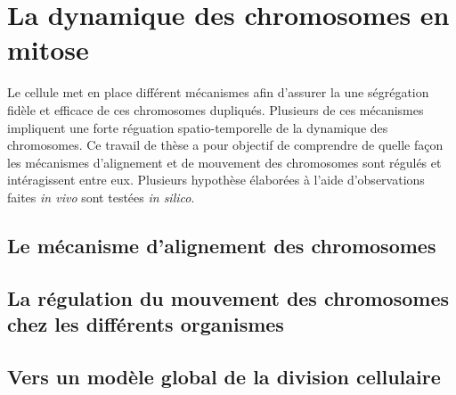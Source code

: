 \documentclass[12pt,a4paper,twoside,openright]{book}
\begin{document}
\section{La dynamique des chromosomes en
mitose}\label{la-dynamique-des-chromosomes-en-mitose}

Le cellule met en place différent mécanismes afin d'assurer la une
ségrégation fidèle et efficace de ces chromosomes dupliqués. Plusieurs
de ces mécanismes impliquent une forte réguation spatio-temporelle de la
dynamique des chromosomes. Ce travail de thèse a pour objectif de
comprendre de quelle façon les mécanismes d'alignement et de mouvement
des chromosomes sont régulés et intéragissent entre eux. Plusieurs
hypothèse élaborées à l'aide d'observations faites \emph{in vivo} sont
testées \emph{in silico}.

\subsection{Le mécanisme d'alignement des
chromosomes}\label{le-muxe9canisme-dalignement-des-chromosomes}

\subsection{La régulation du mouvement des chromosomes chez les
différents
organismes}\label{la-ruxe9gulation-du-mouvement-des-chromosomes-chez-les-diffuxe9rents-organismes}

\subsection{Vers un modèle global de la division
cellulaire}\label{vers-un-moduxe8le-global-de-la-division-cellulaire}
\end{document}

